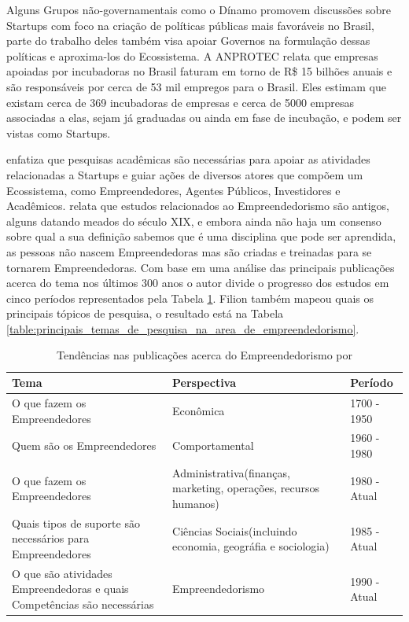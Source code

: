 Alguns Grupos não-governamentais como o Dínamo promovem discussões sobre Startups com foco na criação de políticas públicas mais favoráveis no Brasil, parte do trabalho deles também visa apoiar Governos na formulação dessas políticas e aproxima-los do Ecossistema. A ANPROTEC relata que empresas apoiadas por incubadoras no Brasil faturam em torno de R\$ 15 bilhões anuais e são responsáveis por cerca de 53 mil empregos para o Brasil. Eles estimam que existam cerca de 369 incubadoras de empresas e cerca de 5000 empresas associadas a elas, sejam já graduadas ou ainda em fase de incubação, e podem ser vistas como Startups. 

 enfatiza que pesquisas acadêmicas são necessárias para apoiar as atividades relacionadas a Startups e guiar ações de diversos atores que compõem um Ecossistema, como Empreendedores, Agentes Públicos, Investidores e Acadêmicos.  relata que estudos relacionados ao Empreendedorismo são antigos, alguns datando meados do século XIX, e embora ainda não haja um consenso sobre qual a sua definição sabemos que é uma disciplina que pode ser aprendida, as pessoas não nascem Empreendedoras mas são criadas e treinadas para se tornarem Empreendedoras. Com base em uma análise das principais publicações acerca do tema nos últimos 300 anos o autor divide o progresso dos estudos em cinco períodos representados pela Tabela \ref{table:tendencias_nas_publicacoes_acerca_do_empreendedorismo}. Filion também mapeou quais os principais tópicos de pesquisa, o resultado está na Tabela \ref{table:principais_temas_de_pesquisa_na_area_de_empreendedorismo}.

\begin{table}[!htb]
	\centering
	\begin{tabular}{ | p{6cm} | p{6cm} | p{3cm} | }
		\hline
		Tema & Perspectiva & Período \\ \hline
		O que fazem os Empreendedores & Econômica & 1700 - 1950 \\ \hline
		Quem são os Empreendedores & Comportamental & 1960 - 1980 \\ \hline
		O que fazem os Empreendedores & Administrativa(finanças, marketing, operações, recursos humanos) & 1980 - Atual \\ \hline
		Quais tipos de suporte são necessários para Empreendedores & Ciências Sociais(incluindo economia, geográfia e sociologia) & 1985 - Atual \\ \hline
		O que são atividades Empreendedoras e quais Competências são necessárias & Empreendedorismo & 1990 - Atual \\ \hline
	\end{tabular}
	\caption{Tendências nas publicações acerca do Empreendedorismo por \cite{Filion1998}}	
	\label{table:tendencias_nas_publicacoes_acerca_do_empreendedorismo}
\end{table}


